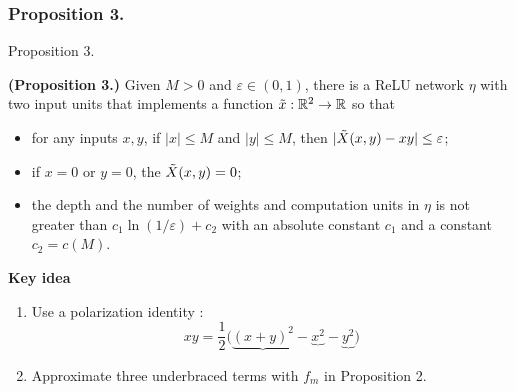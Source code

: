\documentclass{if-beamer}
\begin{document}
\subsubsection{Proposition 3.}
\begin{frame}{Proposition 3.}
    \begin{tcolorbox}
    \textbf{(Proposition 3.)}
        Given $M>0$ and $\varepsilon\in(0,1)$, there is a ReLU network $\eta$ with two input units that implements a function $\Tilde{x}:\mathbb{R}^{2}\rightarrow{\mathbb{R}}$ so that 
        \begin{itemize}
            \item for any inputs $x,y$, if $|x|\leq M$ and $|y|\leq M$, then  $|\Tilde{X}(x,y)-xy|\leq \varepsilon$;
            \item if $x=0$ or $y=0$, the $\Tilde{X}(x,y)=0$;
            \item the depth and the number of weights and computation units in $\eta$ is not greater than $c_{1}\ln(1/\varepsilon)+c_{2}$ with an absolute constant $c_{1}$ and a constant $c_{2}=c(M)$.
        \end{itemize}
    \end{tcolorbox}
    \textbf{Key idea}
    \begin{enumerate}
        \item Use a polarization identity : 
        \begin{equation*}
            xy = \frac{1}{2} \big( \underbrace{(x+y)^{2}}-\underbrace{x^{2}}-\underbrace{y^{2}} \big)
        \end{equation*}
        \item Approximate three underbraced terms with $f_m$ in Proposition 2. 
    \end{enumerate}
\end{frame}
\end{document}
